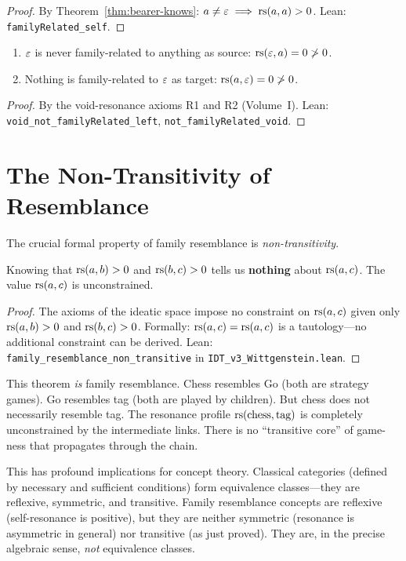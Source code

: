 \begin{proof}
By Theorem~\ref{thm:bearer-knows}: $a \neq \varepsilon \implies \mathrm{rs}(a,a) > 0$.
Lean: \texttt{familyRelated\_self}.
\end{proof}

\begin{theorem}
\label{thm:void-breaks}
\begin{enumerate}
\item $\varepsilon$ is never family-related to anything as source:
$\mathrm{rs}(\varepsilon, a) = 0 \not> 0$.
\item Nothing is family-related to $\varepsilon$ as target: $\mathrm{rs}(a, \varepsilon) = 0 \not> 0$.
\end{enumerate}
\end{theorem}

\begin{proof}
By the void-resonance axioms R1 and R2 (Volume~I).
Lean: \texttt{void\_not\_familyRelated\_left}, \texttt{not\_familyRelated\_void}.
\end{proof}

\section{The Non-Transitivity of Resemblance}

The crucial formal property of family resemblance is \emph{non-transitivity}.

\begin{theorem}
\label{thm:non-transitive}
Knowing that $\mathrm{rs}(a, b) > 0$ and $\mathrm{rs}(b, c) > 0$ tells us \textbf{nothing}
about $\mathrm{rs}(a, c)$. The value $\mathrm{rs}(a, c)$ is unconstrained.
\end{theorem}

\begin{proof}
The axioms of the ideatic space impose no constraint on $\mathrm{rs}(a,c)$ given
only $\mathrm{rs}(a,b) > 0$ and $\mathrm{rs}(b,c) > 0$. Formally: $\mathrm{rs}(a,c) = \mathrm{rs}(a,c)$
is a tautology---no additional constraint can be derived.
Lean: \texttt{family\_resemblance\_non\_transitive} in \texttt{IDT\_v3\_Wittgenstein.lean}.
\end{proof}

\begin{interpretation}
\label{interp:family-resemblance}
This theorem \emph{is} family resemblance. Chess resembles Go (both are
strategy games). Go resembles tag (both are played by children). But chess
does not necessarily resemble tag. The resonance profile $\mathrm{rs}(\text{chess},
\text{tag})$ is completely unconstrained by the intermediate links. There
is no ``transitive core'' of game-ness that propagates through the chain.

This has profound implications for concept theory. Classical categories
(defined by necessary and sufficient conditions) form equivalence
classes---they are reflexive, symmetric, and transitive. Family resemblance
concepts are reflexive (self-resonance is positive), but they are neither
symmetric (resonance is asymmetric in general) nor transitive (as just
proved). They are, in the precise algebraic sense, \emph{not} equivalence
classes.
\end{interpretation}

